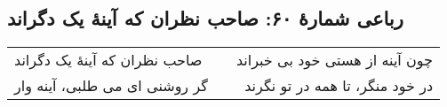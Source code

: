 \begin{center}
\section*{رباعی شمارهٔ ۶۰: صاحب نظران که آینۀ یک دگراند}
\label{sec:060}
\begin{longtable}{l p{0.5cm} r}
صاحب نظران که آینهٔ یک دگراند
&&
چون آینه از هستی خود بی خبراند 
\\
گر روشنی ای می طلبی، آینه وار
&&
در خود منگر، تا همه در تو نگرند
\\
\end{longtable}
\end{center}
